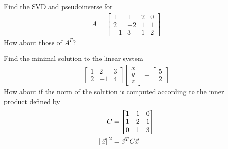 \begin{Exercise}
Find the SVD and pseudoinverse for
\begin{align*}
A = \begin{bmatrix}
1&1&2&0\\ 
2&-2&1&1\\ 
-1&3&1&2
\end{bmatrix}
\end{align*}
How about those of $A^T$?
\end{Exercise}

\begin{Exercise}
Find the minimal solution to the linear system
\begin{align*}
\begin{bmatrix}
1 & 2 & 3 \\
2 & -1 & 4
\end{bmatrix}
\begin{bmatrix}
x \\
y \\
z
\end{bmatrix}
=
\begin{bmatrix}
5 \\
2
\end{bmatrix}
\end{align*}
How about if the norm of the solution is computed according to the inner product defined by
\begin{align*}
C &= 
\begin{bmatrix}
1 & 1 & 0 \\
1 & 2 & 1 \\
0 & 1 & 3
\end{bmatrix} \\
\norm{\vec{x}}^2 &= \vec{x}^TC\vec{x}
\end{align*}
\end{Exercise}